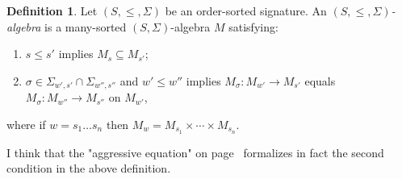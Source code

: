 \documentclass{article}
\theoremstyle{definition}
\theoremstyle{definition}
\theoremstyle{definition}
\newtheorem{definition}{Definition}[section]
\theoremstyle{definition}
\theoremstyle{theorem}
\theoremstyle{theorem}
\theoremstyle{theorem}
\theoremstyle{theorem}
\theoremstyle{theorem}
\begin{document}
{\begin{definition}
Let  $(S,\le,\Sigma)$ be an order-sorted signature. An \emph{ $(S,\le,\Sigma)$-algebra} is a many-sorted $(S,\Sigma)$-algebra $M$ satisfying:
\begin{enumerate}
\item $s\le s'$ implies $M_s\subseteq M_{s'}$;
\item $\sigma\in \Sigma_{w',s'}\cap\Sigma_{w'',s''}$ and $w'\le w''$ implies $M_\sigma:M_{w'}\to M_{s'}$ equals  $M_\sigma:M_{w''}\to M_{s''}$ on $M_{w'}$,
\end{enumerate}
where if $w=s_1\ldots s_n$ then $M_w=M_{s_1}\times\cdots\times M_{s_n}$.
\end{definition}
I think that the "aggressive equation" on page~\pageref{axiom-parametric-symbol} formalizes in fact the second condition in the above definition.
}
\end{document}
